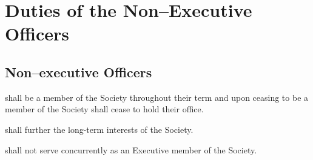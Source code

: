 \begin{longenum}[ label*=\thesubsection.\arabic*., align=left]
\end{longenum}

\newpage

\section{Duties of the Non--Executive Officers}
\subsection {Non--executive Officers} 
\begin{longenum}[ label*=\thesubsection.\arabic*., align=left]
	\item shall be a member of the Society throughout their term and upon ceasing to be a member of the Society shall cease to hold their office.
	\item shall further the long-term interests of the Society.
    \item shall not serve concurrently as an Executive member of the Society.
\end{longenum}
